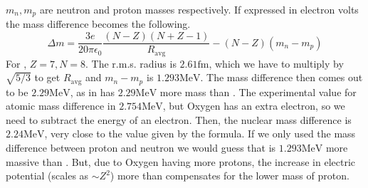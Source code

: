 \documentclass[a4paper, 12pt, oneside]{book}
\begin{document}
$m_n, m_p$ are neutron and proton masses respectively. If expressed in electron volts the mass
difference becomes the following.
\begin{equation}
	\Delta m = \frac{3e}{20 \pi \epsilon_0} \frac{(N-Z)(N+Z-1)}{R_\mathrm{avg}} - (N-Z) (m_n - m_p)
\end{equation}
For , $Z=7, N=8$. The r.m.s. radius is $2.61\unit{\femto\meter}$, which we have to
multiply by $\sqrt{5/3}$ to get $R_\mathrm{avg}$ and $m_n - m_p$ is
$1.293\unit{\mega\electronvolt}$. The mass difference then comes out to be
$2.29\unit{\mega\electronvolt}$, as in  has $2.29\unit{\mega\electronvolt}$ more mass than
. The experimental value for atomic mass difference in $2.754\unit{\mega\electronvolt}$,
but Oxygen has an extra electron, so we need to subtract the energy of an electron. Then, the
nuclear mass difference is $2.24\unit{\mega\electronvolt}$, very close to the value given by the
formula. If we only used the mass difference between proton and neutron we would guess that
 is $1.293\unit{\mega\electronvolt}$ more massive than . But, due to Oxygen having
more protons, the increase in electric potential (scales as $\sim Z^2$) more than compensates for
the lower mass of proton.
\end{document}
